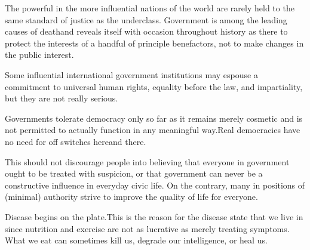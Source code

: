 
The powerful in the more influential nations of the world are rarely held to the same standard of justice as the underclass.
Government is among the leading causes of death and reveals itself with occasion throughout history as there to protect the interests of a handful of principle benefactors,
\footnotecite[wilson2007]
\footnotecite[bowie2012]
\footnotecite[favel2008]
not to make changes in the public interest.

Some influential international government institutions may espouse a commitment to universal human rights, equality before the law, and impartiality, but they are not really serious.

Governments tolerate democracy only so far as it remains merely cosmetic and is not permitted to actually function in any meaningful way. Real democracies have no need for off switches here and there. 

This should not discourage people into believing that everyone in government ought to be treated with suspicion, or that government can never be a constructive influence in everyday civic life. On the contrary, many in positions of (minimal) authority strive to improve the quality of life for everyone.


Disease begins on the plate. This is the reason for the disease state that we live in since nutrition and exercise are not as lucrative as merely treating symptoms. What we eat can sometimes kill us,
degrade our intelligence,
or heal us.
\footnotecite[cavusoglu2009]

